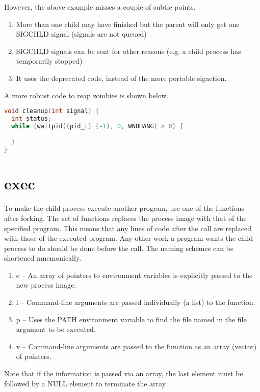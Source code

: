 However, the above example misses a couple of subtle points.
\begin{enumerate}
    \item More than one child may have finished but the parent will only get one SIGCHLD signal (signals are not queued)
    \item SIGCHLD signals can be sent for other reasons (e.g. a child process has temporarily stopped)
    \item It uses the deprecated  code, instead of the more portable sigaction.
\end{enumerate}

A more robust code to reap zombies is shown below.

\begin{lstlisting}[language=C]
void cleanup(int signal) {
  int status;
  while (waitpid((pid_t) (-1), 0, WNOHANG) > 0) {

  }
}
\end{lstlisting}

\section{exec}

To make the child process execute another program, use one of the  functions after forking.
The  set of functions replaces the process image with that of the specified program.
This means that any lines of code after the  call are replaced with those of the executed program.
Any other work a program wants the child process to do should be done before the  call.
The naming schemes can be shortened mnemonically.

\begin{enumerate}
    \item e -- An array of pointers to environment variables is explicitly passed to the new process image.
    \item l -- Command-line arguments are passed individually (a list) to the function.
    \item p -- Uses the PATH environment variable to find the file named in the file argument to be executed.
    \item v -- Command-line arguments are passed to the function as an array (vector) of pointers.
\end{enumerate}

Note that if the information is passed via an array, the last element must be followed by a NULL element to terminate the array.

